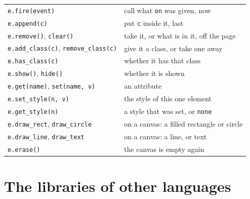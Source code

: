 \begin{center}
\begin{longtable}{lP{8.1cm}}
\verb|e.fire(event)| & call what \verb|on| was given, now \\
\verb|e.append(c)| & put \verb|c| inside it, last \\
\verb|e.remove()|, \verb|clear()| & take it, or what is in it, off the page \\
\verb|e.add_class(c)|, \verb|remove_class(c)| & give it a class, or take one away \\
\verb|e.has_class(c)| & whether it has that class \\
\verb|e.show()|, \verb|hide()| & whether it is shown \\
\verb|e.get(name)|, \verb|set(name, v)| & an attribute \\
\verb|e.set_style(n, v)| & the style of this one element \\
\verb|e.get_style(n)| & a style that was set, or \verb|none| \\
\verb|e.draw_rect|, \verb|draw_circle| & on a canvas: a filled rectangle or circle \\
\verb|e.draw_line|, \verb|draw_text| & on a canvas: a line, or text \\
\verb|e.erase()| & the canvas is empty again \\
\bottomrule
\end{longtable}
\end{center}

\section*{The libraries of other languages}

